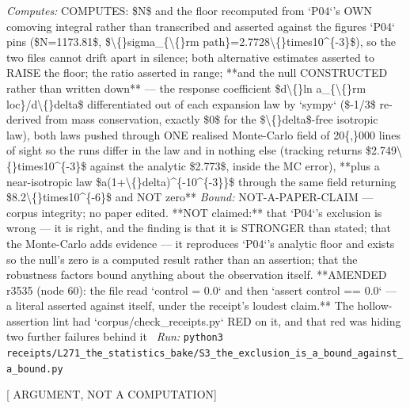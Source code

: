 \begin{description}
\emph{Computes:} COMPUTES: \$N\$ and the floor recomputed from `P04`'s OWN comoving integral rather than transcribed and asserted against the figures `P04` pins (\$N=1173.81\$, \$\textbackslash\{\}sigma\_\{\textbackslash\{\}rm path\}=2.7728\textbackslash\{\}times10\textasciicircum{}\{-3\}\$), so the two files cannot drift apart in silence; both alternative estimates asserted to RAISE the floor; the ratio asserted in range; **and the null CONSTRUCTED rather than written down** --- the response coefficient \$d\textbackslash\{\}ln a\_\{\textbackslash\{\}rm loc\}/d\textbackslash\{\}delta\$ differentiated out of each expansion law by `sympy` (\$-1/3\$ re-derived from mass conservation, exactly \$0\$ for the \$\textbackslash\{\}delta\$-free isotropic law), both laws pushed through ONE realised Monte-Carlo field of 20\{,\}000 lines of sight so the runs differ in the law and in nothing else (tracking returns \$2.749\textbackslash\{\}times10\textasciicircum{}\{-3\}\$ against the analytic \$2.773\$, inside the MC error), **plus a near-isotropic law \$a(1+\textbackslash\{\}delta)\textasciicircum{}\{-10\textasciicircum{}\{-3\}\}\$ through the same field returning \$8.2\textbackslash\{\}times10\textasciicircum{}\{-6\}\$ and NOT zero**
 \emph{Bound:} NOT-A-PAPER-CLAIM --- corpus integrity; no paper edited. **NOT claimed:** that `P04`'s exclusion is wrong --- it is right, and the finding is that it is STRONGER than stated; that the Monte-Carlo adds evidence --- it reproduces `P04`'s analytic floor and exists so the null's zero is a computed result rather than an assertion; that the robustness factors bound anything about the observation itself.  **AMENDED r3535 (node 60): the file read `control = 0.0` and then `assert control == 0.0` --- a literal asserted against itself, under the receipt's loudest claim.** The hollow-assertion lint had `corpus/check\_receipts.py` RED on it, and that red was hiding two further failures behind it
\ \emph{Run:} \texttt{python3 receipts/L271\_the\_statistics\_bake/S3\_the\_exclusion\_is\_a\_bound\_against\_a\_bound.py}
\item[\label{rcpt:S9_the_shared_failure_is_the_discriminating_datum}\texttt{S9\_the\_shared\_failure\_is\_the\_discriminating\_datum}]\hfill\textsf{[ ARGUMENT, NOT A COMPUTATION]}\\

\end{description}

